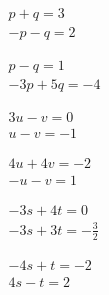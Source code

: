 \begin{exercise}
\begin{Parts}
\item\(\begin{array}{l} p +q=3\\ -p-q=2 \end{array}\)

\begin{OmitV1}
\item\(\begin{array}{l} p -q=1\\ -3p +5q=-4 \end{array}\)

\item\(\begin{array}{l} 3u -v=0\\ u -v=-1 \end{array}\)
\end{OmitV1}

\item\(\begin{array}{l} 4u +4v=-2\\ -u -v=1 \end{array}\)

\item\(\begin{array}{l} -3s +4t=0\\ -3s +3t=-\frac32 \end{array}\)

\item\(\begin{array}{l} -4s +t=-2\\ 4s -t=2 \end{array}\)

\end{Parts}
\end{exercise}






